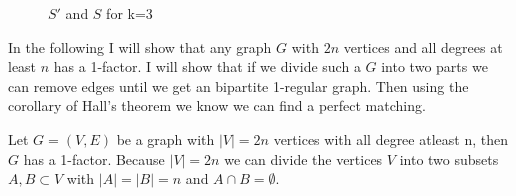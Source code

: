 \documentclass[a4paper]{article}
\begin{document}
\begin{solution}{11}
\begin{figure}[h]
		\caption{$S'$ and $S$ for k=3}
		\end{figure}
	\end{solution} 
	\newpage
	\begin{solution}{12}
	In the following I will show that any graph $G$ with $2n$ vertices and all degrees at least $n$ has a 1-factor. 	
	I will show that if we divide such a $G$ into two parts we can remove edges until we get an bipartite 1-regular graph. 
	Then using the corollary of Hall's theorem we know we can find a perfect matching.
		\begin{theorem}{Let $G=(V,E)$ be a graph with $|V| = 2n$ vertices with all degree atleast n, then $G$ has a 1-factor.}
		Because $|V| = 2n$ we can divide the vertices $V$ into two subsets $A,B \subset V$ with $|A|=|B|=n$ and $A \cap B = \emptyset$. 
		
	
		\end{theorem}
	\end{solution}
	
\end{document}
